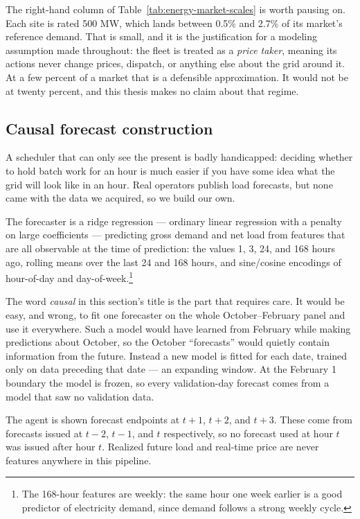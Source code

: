 ﻿\documentclass[12pt]{article}
\begin{document}
The right-hand column of Table~\ref{tab:energy-market-scales} is worth pausing
on. Each site is rated 500 MW, which lands between 0.5\% and 2.7\% of its
market's reference demand. That is small, and it is the justification for a
modeling assumption made throughout: the fleet is treated as a
\emph{price taker}, meaning its actions never change prices, dispatch, or
anything else about the grid around it. At a few percent of a market that is a
defensible approximation. It would not be at twenty percent, and this thesis
makes no claim about that regime.

\subsection{Causal forecast construction}
\label{subsec:energy-forecasts}

A scheduler that can only see the present is badly handicapped: deciding whether
to hold batch work for an hour is much easier if you have some idea what the
grid will look like in an hour. Real operators publish load forecasts, but none
came with the data we acquired, so we build our own.

The forecaster is a ridge regression --- ordinary linear regression with a
penalty on large coefficients --- predicting gross demand and net load from
features that are all observable at the time of prediction: the values 1, 3, 24,
and 168 hours ago, rolling means over the last 24 and 168 hours, and sine/cosine
encodings of hour-of-day and day-of-week.\footnote{The 168-hour features are
weekly: the same hour one week earlier is a good predictor of electricity
demand, since demand follows a strong weekly cycle.}

The word \emph{causal} in this section's title is the part that requires care.
It would be easy, and wrong, to fit one forecaster on the whole
October--February panel and use it everywhere. Such a model would have learned
from February while making predictions about October, so the October
``forecasts'' would quietly contain information from the future. Instead a new
model is fitted for each date, trained only on data preceding that date --- an
expanding window. At the February 1 boundary the model is frozen, so every
validation-day forecast comes from a model that saw no validation data.

The agent is shown forecast endpoints at \(t+1\), \(t+2\), and \(t+3\). These
come from forecasts issued at \(t-2\), \(t-1\), and \(t\) respectively, so no
forecast used at hour \(t\) was issued after hour \(t\). Realized future load
and real-time price are never features anywhere in this pipeline.
\end{document}
